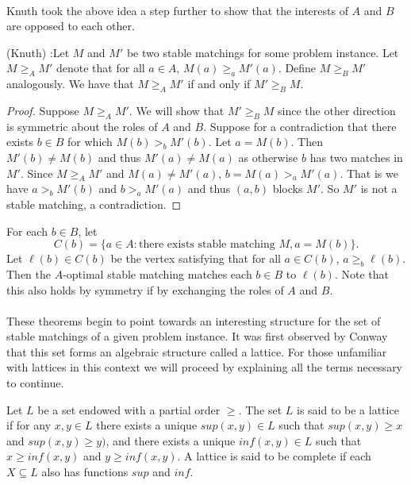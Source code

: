 \paragraph{} Knuth took the above idea a step further to show that the interests of $A$ and $B$ are opposed to each other. 
\begin{theorem} (Knuth) \cite{knuthmariages}:Let $M$ and $M'$ be two stable matchings for some problem instance. Let $M \geq_A M'$ denote that for all $a \in A$, $M(a) \geq_a M'(a)$. Define $M \geq_B M'$ analogously. We have that $M \geq_A M'$ if and only if $M' \geq_B M$.
\end{theorem}
\begin{proof}
Suppose $M \geq_A M'$. We will show that $M' \geq_B M$ since the other direction is symmetric about the roles of $A$ and $B$. Suppose for a contradiction that there exists $b \in B$ for which $M(b) >_b M'(b)$. Let $a = M(b)$. Then $M'(b) \neq M(b)$ and thus $M'(a) \neq M(a)$ as otherwise $b$ has two matches in $M'$. Since $M \geq_A M'$ and $M(a) \neq M'(a)$, $b=M(a) >_a M'(a)$. That is we have $a >_b M'(b)$ and $b >_a M'(a)$ and thus $(a,b)$ blocks $M'$. So $M'$ is not a stable matching, a contradiction. \end{proof}
\begin{corollary}For each $b \in B$, let $$C(b) = \{a \in A: \text{there exists stable matching }M, a = M(b)\}.$$ Let $\ell(b) \in C(b)$  be the vertex satisfying that for all $a \in C(b)$, $a \geq_b \ell(b)$. Then the $A$-optimal stable matching matches each $b \in B$ to $\ell(b)$. Note that this also holds by symmetry if by exchanging the roles of $A$ and $B$.
\end{corollary}
\paragraph{}
These theorems begin to point towards an interesting structure for the set of stable matchings of a given problem instance. It was first observed by Conway \cite{knuthmariages} that this set forms an algebraic structure called a lattice. For those unfamiliar with lattices in this context we will proceed by explaining all the terms necessary to continue.
\begin{definition}
Let $L$ be a set endowed with a partial order $\geq$. The set $L$ is said to be a lattice if for any $x, y \in L$ there exists a unique $sup(x,y) \in L$ such that $sup(x,y) \geq x$ and $sup(x,y) \geq y)$, and there exists a unique $inf(x,y) \in L$ such that $x \geq inf(x,y)$ and $y \geq inf(x,y)$. A lattice is said to be complete if each $X \subseteq L$ also has functions $sup$ and $inf$. 
\end{definition}
